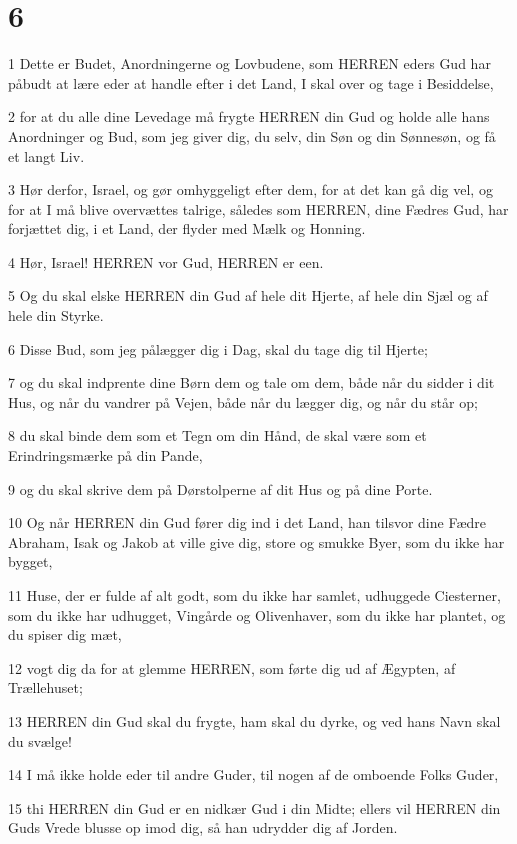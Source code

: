 \chapter{6}

\par 1 Dette er Budet, Anordningerne og Lovbudene, som HERREN eders Gud har påbudt at lære eder at handle efter i det Land, I skal over og tage i Besiddelse,
\par 2 for at du alle dine Levedage må frygte HERREN din Gud og holde alle hans Anordninger og Bud, som jeg giver dig, du selv, din Søn og din Sønnesøn, og få et langt Liv.
\par 3 Hør derfor, Israel, og gør omhyggeligt efter dem, for at det kan gå dig vel, og for at I må blive overvættes talrige, således som HERREN, dine Fædres Gud, har forjættet dig, i et Land, der flyder med Mælk og Honning.
\par 4 Hør, Israel! HERREN vor Gud, HERREN er een.
\par 5 Og du skal elske HERREN din Gud af hele dit Hjerte, af hele din Sjæl og af hele din Styrke.
\par 6 Disse Bud, som jeg pålægger dig i Dag, skal du tage dig til Hjerte;
\par 7 og du skal indprente dine Børn dem og tale om dem, både når du sidder i dit Hus, og når du vandrer på Vejen, både når du lægger dig, og når du står op;
\par 8 du skal binde dem som et Tegn om din Hånd, de skal være som et Erindringsmærke på din Pande,
\par 9 og du skal skrive dem på Dørstolperne af dit Hus og på dine Porte.
\par 10 Og når HERREN din Gud fører dig ind i det Land, han tilsvor dine Fædre Abraham, Isak og Jakob at ville give dig, store og smukke Byer, som du ikke har bygget,
\par 11 Huse, der er fulde af alt godt, som du ikke har samlet, udhuggede Ciesterner, som du ikke har udhugget, Vingårde og Olivenhaver, som du ikke har plantet, og du spiser dig mæt,
\par 12 vogt dig da for at glemme HERREN, som førte dig ud af Ægypten, af Trællehuset;
\par 13 HERREN din Gud skal du frygte, ham skal du dyrke, og ved hans Navn skal du svælge!
\par 14 I må ikke holde eder til andre Guder, til nogen af de omboende Folks Guder,
\par 15 thi HERREN din Gud er en nidkær Gud i din Midte; ellers vil HERREN din Guds Vrede blusse op imod dig, så han udrydder dig af Jorden.

